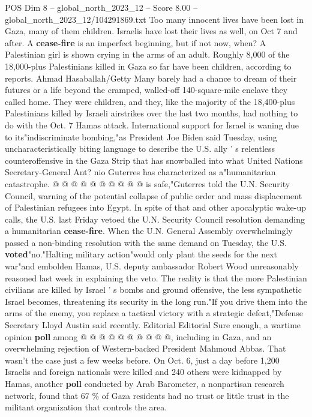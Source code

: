 \begin{textsample}{POS Dim 8 – global\_north\_2023\_12 – Score 8.00 – global\_north\_2023\_12/104291869.txt}  \label{ex:f8_pos_120}
Too many innocent lives have been lost in Gaza, many of them children.
Israelis have lost their lives as well, on Oct 7 and after.
A \textbf{cease-fire} is an imperfect beginning, but if not now, when?
A Palestinian girl is shown crying in the arms of an adult.
Roughly 8,000 of the 18,000-plus Palestinians killed in Gaza so far have been children, according to reports.
Ahmad Hasaballah/Getty Many barely had a chance to dream of their futures or a life beyond the cramped, walled-off 140-square-mile enclave they called home.
They were children, and they, like the majority of the 18,400-plus Palestinians killed by Israeli airstrikes over the last two months, had nothing to do with the Oct. 7 Hamas attack.
International support for Israel is waning due to its"indiscriminate bombing,"as President Joe Biden said Tuesday, using uncharacteristically biting language to describe the U.S. ally ' s relentless counteroffensive in the Gaza Strip that has snowballed into what United Nations Secretary-General Ant? nio Guterres has characterized as a"humanitarian catastrophe. @ @ @ @ @ @ @ @ @ @ is safe,"Guterres told the U.N.
Security Council, warning of the potential collapse of public order and mass displacement of Palestinian refugees into Egypt.
In spite of that and other apocalyptic wake-up calls, the U.S. last Friday vetoed the U.N.
Security Council resolution demanding a humanitarian \textbf{cease-fire}.
When the U.N.
General Assembly overwhelmingly passed a non-binding resolution with the same demand on Tuesday, the U.S. \textbf{voted}"no."Halting military action"would only plant the seeds for the next war"and embolden Hamas, U.S. deputy ambassador Robert Wood unreasonably reasoned last week in explaining the veto.
The reality is that the more Palestinian civilians are killed by Israel ' s bombs and ground offensive, the less sympathetic Israel becomes, threatening its security in the long run."If you drive them into the arms of the enemy, you replace a tactical victory with a strategic defeat,"Defense Secretary Lloyd Austin said recently.
Editorial Editorial Sure enough, a wartime opinion \textbf{poll} among @ @ @ @ @ @ @ @ @ @, including in Gaza, and an overwhelming rejection of Western-backed President Mahmoud Abbas.
That wasn't the case just a few weeks before.
On Oct. 6, just a day before 1,200 Israelis and foreign nationals were killed and 240 others were kidnapped by Hamas, another \textbf{poll} conducted by Arab Barometer, a nonpartisan research network, found that 67 \% of Gaza residents had no trust or little trust in the militant organization that controls the area.

\end{textsample}
